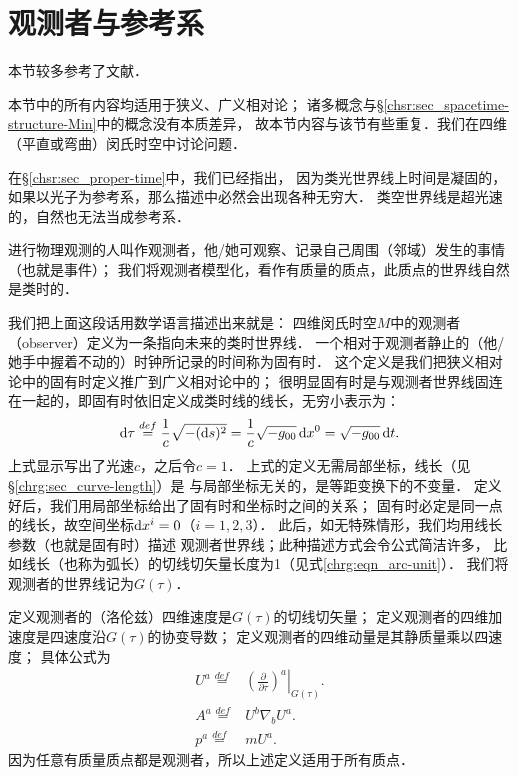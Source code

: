 \section{观测者与参考系}\label{chfd:sec_oberver}

本节较多参考了文献\parencite[\S 2.1]{sachs-wu-1977}．

本节中的所有内容均适用于狭义、广义相对论；
诸多概念与\S\ref{chsr:sec_spacetime-structure-Min}中的概念没有本质差异，
故本节内容与该节有些重复．我们在四维（平直或弯曲）闵氏时空中讨论问题．

在\S \ref{chsr:sec_proper-time}中，我们已经指出，
因为类光世界线上时间是凝固的，如果以光子为参考系，那么描述中必然会出现各种无穷大．
类空世界线是超光速的，自然也无法当成参考系．



进行物理观测的人叫作观测者，他/她可观察、记录自己周围（邻域）发生的事情（也就是事件）；
我们将观测者模型化，看作有质量的质点，此质点的世界线自然是类时的．


我们把上面这段话用数学语言描述出来就是：
四维闵氏时空$M$中的{\heiti 观测者}（observer）定义为一条指向未来的类时世界线．
一个相对于观测者静止的（他/她手中握着不动的）时钟所记录的时间称为{\heiti 固有时}．
这个定义是我们把狭义相对论中的固有时定义推广到广义相对论中的；
很明显固有时是与观测者世界线固连在一起的，即固有时依旧定义成类时线的线长，无穷小表示为：
\begin{equation}\label{chfd:eqn_proper-time}
    {\rm d}\tau \overset{def}{=} \frac{1}{c} \sqrt{-({\rm d}s)^2} 
    = \frac{1}{c}  \sqrt{-g_{00} }\, {\rm d}x^0
    = \sqrt{-g_{00}}\, {\rm d}t .
\end{equation}
上式显示写出了光速$c$，之后令$c=1$．
上式的定义无需局部坐标，线长（见\S\ref{chrg:sec_curve-length}）是
与局部坐标无关的，是等距变换下的不变量．
定义好后，我们用局部坐标给出了固有时和坐标时之间的关系；
固有时必定是同一点的线长，故空间坐标${\rm d}x^i=0$（$i=1,2,3$）．
此后，如无特殊情形，我们均用线长参数（也就是固有时）描述
观测者世界线；此种描述方式会令公式简洁许多，
比如线长（也称为弧长）的切线切矢量长度为1（见式\eqref{chrg:eqn_arc-unit}）．
我们将观测者的世界线记为$G(\tau)$．

   

定义观测者的（洛伦兹）{\heiti 四维速度}是$G(\tau)$的切线切矢量；
定义观测者的{\heiti 四维加速度}是四速度沿$G(\tau)$的协变导数；
定义观测者的{\heiti 四维动量}是其静质量乘以四速度；
具体公式为
\begin{align}
    U^a \overset{def}{=} & \left.\left(\frac{\partial}{\partial \tau}\right)^a
      \right|_{G(\tau)}.   \label{chfd:eqn_4-velocity} \\
    A^a \overset{def}{=} & U^b \nabla_b U^a . \label{chfd:eqn_4-acceleration} \\
    p^a \overset{def}{=} & m U^a . \label{chfd:eqn_4-momentum}
\end{align}
因为任意有质量质点都是观测者，所以上述定义适用于所有质点．

